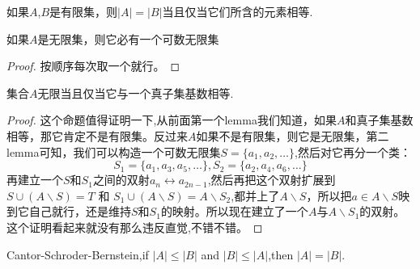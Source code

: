 \begin{lemma}
如果$A$,$B$是有限集，则$|A|=|B|$当且仅当它们所含的元素相等.
\end{lemma}

\begin{lemma}
如果$A$是无限集，则它必有一个可数无限集
\end{lemma}

\begin{proof}
按顺序每次取一个就行。
\end{proof}

\begin{proposition}
集合$A$无限当且仅当它与一个真子集基数相等.
\end{proposition}

\begin{proof}
这个命题值得证明一下,从前面第一个lemma我们知道，如果$A$和真子集基数相等，那它肯定不是有限集。反过来$A$如果不是有限集，则它是无限集，第二lemma可知，我们可以构造一个可数无限集$S=\{a_1,a_2,\ldots\}$,然后对它再分一个类：\[S_1 = \{a_1, a_3, a_5, \ldots\}, S_2 = \{a_2, a_4, a_6, \ldots\}\]再建立一个$S$和$S_1$之间的双射$a_n \leftrightarrow a_{2n-1}$,然后再把这个双射扩展到$S \cup (A \smallsetminus S) = T$ 和 $S_1 \cup (A \smallsetminus S) = A \smallsetminus S_2$,都并上了$A \smallsetminus S$，所以把$a \in A \smallsetminus S$映到它自己就行，还是维持$S$和$S_1$的映射。所以现在建立了一个$A$与$A \smallsetminus S_1$的双射。这个证明看起来就没有那么违反直觉,不错不错。
\end{proof}

\begin{theorem}
Cantor-Schroder-Bernstein,if $|A|\leq|B|$ and $|B|\leq |A|$,then $|A|=|B|$.
\end{theorem}

